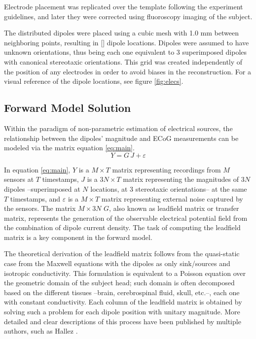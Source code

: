 \documentclass[draftcls, onecolumn, peerreview]{IEEEtran}
\begin{document}
Electrode placement was replicated over the template following the experiment guidelines, and 
later they
%
were corrected using fluoroscopy imaging of the subject.

The distributed dipoles were placed using a cubic mesh with 1.0 mm between neighboring points,
resulting in [] dipole locations.
%
Dipoles were assumed to have unknown orientations, thus being each one equivalent to 3 superimposed dipoles with canonical stereotaxic orientations.
%
This grid was created independently of the position of any electrodes 
in order to avoid biases in the reconstruction.
%
%
For a visual reference of the dipole locations, see figure \ref{fig:elecs}.


\subsection{Forward Model Solution}

Within the paradigm of non-parametric estimation of electrical sources, the relationship between the dipoles' magnitude and ECoG measurements can be modeled via the matrix equation \eqref{eq:main}. 
%
\begin{equation}
    Y = G\, J + \varepsilon
    \label{eq:main}
\end{equation}

In equation \eqref{eq:main}, $Y$ is a $M\times T$ matrix representing recordings from $M$ sensors at $T$ timestamps, $J$ is a $3N\times T$ matrix representing the magnitudes of $3N$ dipoles --superimposed at $N$ locations, at 3 stereotaxic orientations-- at the same $T$ timestamps, and $\varepsilon$ is a $M\times T$ matrix representing external noise captured by the sensors. 
%
The matrix $M\times 3N$ $G$, also known as leadfield matrix or transfer matrix, represents the generation of the observable electrical potential field from the combination of dipole current density.
%
The task of computing the leadfield matrix is a key component in the forward model.

The theoretical derivation of the leadfield matrix follows from the quasi-static case from the Maxwell equations with the dipoles as only sink/sources and isotropic conductivity. 
%
This formulation is equivalent to a Poisson equation over the geometric domain of the subject head; such domain is often decomposed based on the different tissues --brain, cerebrospinal fluid, skull, etc.--, each one with constant conductivity.
%
Each column of the leadfield matrix is obtained by solving such a problem for each dipole position with unitary magnitude.
%
More detailed and clear descriptions of this process have been published by multiple authors, such as Hallez \cite{hallez_review}.
\end{document}

